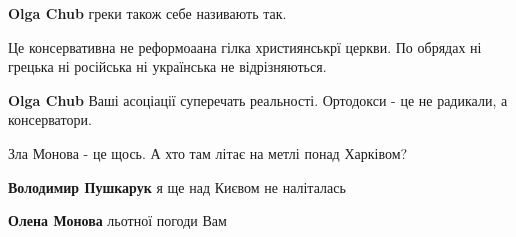 \begin{itemize}
\begin{itemize}
 
\textbf{Olga Chub} греки також себе називають так.

 
Це консервативна не реформоаана гілка християнськрї церкви. По обрядах ні грецька ні російська ні українська не відрізняються.

 
\textbf{Olga Chub} Ваші асоціації суперечать реальності. Ортодокси - це не радикали, а консерватори.
\end{itemize}

 
Зла Монова - це щось.
А хто там літає на метлі понад Харківом?

\begin{itemize}
 
\textbf{Володимир Пушкарук} я ще над Києвом не наліталась

 
\textbf{Олена Монова} льотної погоди Вам


\end{itemize}
\end{itemize}
